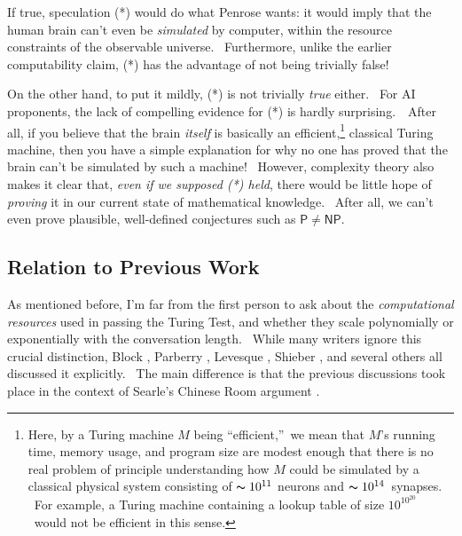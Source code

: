 \documentclass[12pt,onecolumn]{article}%
\begin{document}
If true, speculation (*) would do what Penrose wants: it would imply that the
human brain can't even be \textit{simulated} by computer, within the resource
constraints of the observable universe. \ Furthermore, unlike the earlier
computability claim, (*) has the advantage of not being trivially false!

On the other hand, to put it mildly, (*) is not trivially \textit{true}
either. \ For AI proponents, the lack of compelling evidence for (*) is hardly
surprising.\ \ After all, if you believe that the brain \textit{itself} is
basically an efficient,\footnote{Here, by a Turing machine $M$ being
\textquotedblleft efficient,\textquotedblright\ we mean that $M$'s running
time, memory usage, and program size are modest enough that there is no real
problem of principle understanding how $M$ could be simulated by a classical
physical system consisting of $\thicksim10^{11}$ neurons and $\thicksim
10^{14}$\ synapses. \ For example, a Turing machine containing a lookup table
of size $10^{10^{20}}$\ would not be efficient in this sense.} classical
Turing machine, then you have a simple explanation for why no one has proved
that the brain can't be simulated by such a machine! \ However, complexity
theory also makes it clear that, \textit{even if we supposed (*) held}, there
would be little hope of \textit{proving} it in our current state of
mathematical knowledge. \ After all, we can't even prove plausible,
well-defined conjectures such as $\mathsf{P}\neq\mathsf{NP}$.

\subsection{Relation to Previous Work\label{PREVWORK}}

As mentioned before, I'm far from the first person to ask about the
\textit{computational resources} used in passing the Turing Test, and whether
they scale polynomially or exponentially with the conversation length. \ While
many writers ignore this crucial distinction, Block \cite{block}, Parberry
\cite{parberry}, Levesque \cite{levesque}, Shieber \cite{shieber}, and several
others all discussed it explicitly. \ The main difference is that the previous
discussions took place in the context of Searle's Chinese Room argument
\cite{searle}.
\end{document}
